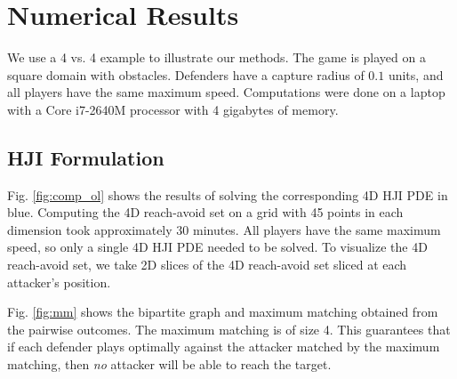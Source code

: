\section{Numerical Results}
\label{sec:simulation}
We use a 4 vs. 4 example to illustrate our methods. The game is played on a square domain with obstacles. Defenders have a capture radius of $0.1$ units, and all players have the same maximum speed. Computations were done on a laptop with a Core i7-2640M processor with 4 gigabytes of memory.

\subsection{HJI Formulation}
Fig.  \ref{fig:comp_ol} shows the results of solving the corresponding 4D HJI PDE in blue. Computing the 4D reach-avoid set on a grid with 45 points in each dimension took approximately 30 minutes. All players have the same maximum speed, so only a single 4D HJI PDE needed to be solved. To visualize the 4D reach-avoid set, we take 2D slices of the 4D reach-avoid set sliced at each attacker's position. %


Fig. \ref{fig:mm} shows the bipartite graph and maximum matching obtained from the pairwise outcomes. The maximum matching is of size 4. This guarantees that if each defender plays optimally against the attacker matched by the maximum matching, then \textit{no} attacker will be able to reach the target.

%

